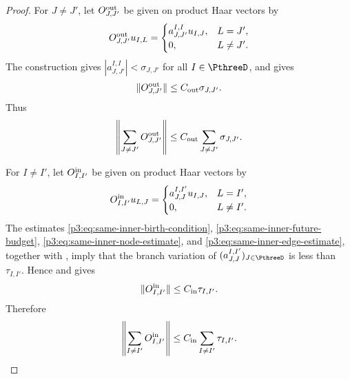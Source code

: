 \documentclass[11pt,reqno]{amsart}
\makeatletter
\theoremstyle{plain}
\theoremstyle{definition}
\newcounter{problempaper}
\newenvironment{problempaperbody}{%
  \setcounter{subsection}{0}%
  \setcounter{subsubsection}{0}%
  \setcounter{paragraph}{0}%
  \renewcommand{\thesubsection}{\arabic{subsection}}%
  \renewcommand{\thesubsubsection}{\thesubsection.\arabic{subsubsection}}%
  \renewcommand{\theparagraph}{\thesubsubsection.\arabic{paragraph}}%
  \let\problem@outersection\section
  \let\problem@outersubsection\subsection
  \let\problem@outersubsubsection\subsubsection
  \let\problem@outerparagraph\paragraph
  \let\section\problem@papersection
  \let\subsection\problem@papersubsection
  \let\subsubsection\problem@papersubsubsection
}{%
  \let\section\problem@outersection
  \let\subsection\problem@outersubsection
  \let\subsubsection\problem@outersubsubsection
  \let\paragraph\problem@outerparagraph
}
\newcommand{\problem@target}[2]{%
  \hypertarget{problem-\theproblempaper-#1-#2}{}%
}
\newcommand{\problem@paperheading}[3]{%
  \par\bigskip
  \problem@target{#1}{#2}%
  \noindent{\large\bfseries #2.\quad #3\par}%
  \nobreak\smallskip
}
\newcommand{\problem@papersubheading}[3]{%
  \par\medskip
  \problem@target{#1}{#2}%
  \noindent{\normalsize\bfseries #2.\quad #3\par}%
  \nobreak\smallskip
}
\newcommand{\problem@papersubsubheading}[3]{%
  \par\smallskip
  \problem@target{#1}{#2}%
  \noindent{\normalsize\itshape #2.\quad #3.\ }%
}
\def\problem@papersection{%
  \@ifstar{\problem@papersectionstar}{\problem@papersectionnostar}%
}
\def\problem@papersectionstar#1{%
  \par\bigskip\noindent{\large\bfseries #1\par}\nobreak\smallskip
}
\def\problem@papersectionnostar#1{%
  \refstepcounter{subsection}%
  \setcounter{subsubsection}{0}%
  \setcounter{paragraph}{0}%
  \problem@paperheading{section}{\thesubsection}{#1}%
  \problem@writecontentsline{section}{\thesubsection}{#1}%
}
\def\problem@papersubsection{%
  \@ifstar{\problem@papersubsectionstar}{\problem@papersubsectionnostar}%
}
\def\problem@papersubsectionstar#1{%
  \par\medskip\noindent{\normalsize\bfseries #1\par}\nobreak\smallskip
}
\def\problem@papersubsectionnostar#1{%
  \refstepcounter{subsubsection}%
  \setcounter{paragraph}{0}%
  \problem@papersubheading{subsection}{\thesubsubsection}{#1}%
  \problem@writecontentsline{subsection}{\thesubsubsection}{#1}%
}
\def\problem@papersubsubsection{%
  \@ifstar{\problem@papersubsubsectionstar}{\problem@papersubsubsectionnostar}%
}
\def\problem@papersubsubsectionstar#1{%
  \par\smallskip\noindent{\normalsize\itshape #1.\ }%
}
\def\problem@papersubsubsectionnostar#1{%
  \refstepcounter{paragraph}%
  \problem@papersubsubheading{subsubsection}{\theparagraph}{#1}%
  \problem@writecontentsline{subsubsection}{\theparagraph}{#1}%
}
\newcommand{\problem@writecontentsline}[3]{%
  \begingroup
  \protected@write\@auxout{}{%
    \string\problemcontentsentry{\theproblempaper}{#1}{#2}{#3}{\thepage}%
  }%
  \endgroup
}
\newcommand{\problemcontentsentry}[5]{%
  \@ifundefined{problemcontents@#1}{%
    \expandafter\gdef\csname problemcontents@#1\endcsname{}%
  }{}%
  \expandafter\g@addto@macro\csname problemcontents@#1\endcsname{%
    \problemcontentsline{#1}{#2}{#3}{#4}{#5}%
  }%
}
\newcommand{\problemcontentslink}[4]{%
  \hyperlink{problem-#1-#2-#3}{#4}%
}
\newcommand{\problemcontentsline}[5]{%
  \ifstrequal{#2}{section}{%
    \par\noindent
    \problemcontentslink{#1}{#2}{#3}{\makebox[2.5em][l]{#3}#4}%
    \nobreak\dotfill
    \problemcontentslink{#1}{#2}{#3}{#5}\par
  }{%
    \ifstrequal{#2}{subsection}{%
      \par\noindent\hspace*{1.5em}%
      \problemcontentslink{#1}{#2}{#3}{\makebox[3.5em][l]{#3}#4}%
      \nobreak\dotfill
      \problemcontentslink{#1}{#2}{#3}{#5}\par
    }{%
      \par\noindent\hspace*{3em}%
      \problemcontentslink{#1}{#2}{#3}{\makebox[4.5em][l]{#3}#4}%
      \nobreak\dotfill
      \problemcontentslink{#1}{#2}{#3}{#5}\par
    }%
  }%
}
\makeatother
\begin{document}
\begin{problempaperbody}
\begin{proof}
For $J\ne J'$, let $O_{J,J'}^{\rm out}$ be given on product Haar vectors by
\begin{equation*}
        O_{J,J'}^{\rm out}u_{I,L}=\begin{cases} a_{J,J'}^{I,I}u_{I,J},&L=J',\\ 0,&L\ne J'. \end{cases}
\end{equation*}
The construction gives $|a_{J,J'}^{I,I}|<\sigma_{J,J'}$ for all $I\in\PthreeD$, and  gives
\begin{equation*}
        \|O_{J,J'}^{\rm out}\|\leq C_{\rm out}\sigma_{J,J'}.
\end{equation*}
Thus
\begin{equation}
\label{p3:eq:same-outer-total-estimate}
        \left\|\sum_{J\ne J'}O_{J,J'}^{\rm out}\right\|\leq C_{\rm out}\sum_{J\ne J'}\sigma_{J,J'}.
\end{equation}

For $I\ne I'$, let $O_{I,I'}^{\rm in}$ be given on product Haar vectors by
\begin{equation*}
        O_{I,I'}^{\rm in}u_{L,J}=\begin{cases} a_{J,J}^{I,I'}u_{I,J},&L=I',\\ 0,&L\ne I'. \end{cases}
\end{equation*}
The estimates \eqref{p3:eq:same-inner-birth-condition}, \eqref{p3:eq:same-inner-future-budget}, \eqref{p3:eq:same-inner-node-estimate}, and \eqref{p3:eq:same-inner-edge-estimate}, together with , imply that the branch variation of $(a_{J,J}^{I,I'})_{J\in\PthreeD}$ is less than $\tau_{I,I'}$. Hence  and  gives
\begin{equation*}
        \|O_{I,I'}^{\rm in}\|\leq C_{\rm in}\tau_{I,I'}.
\end{equation*}
Therefore
\begin{equation}
\label{p3:eq:same-inner-total-estimate}
        \left\|\sum_{I\ne I'}O_{I,I'}^{\rm in}\right\|\leq C_{\rm in}\sum_{I\ne I'}\tau_{I,I'}.
\end{equation}


\end{proof}
\end{problempaperbody}
\end{document}
